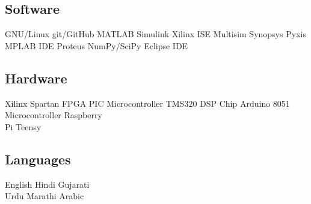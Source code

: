 \documentclass[]{deedy}
\begin{document}
\begin{minipage}[t]{0.27\textwidth}
\begin{flushleft}
\subsection{Software}
GNU/Linux \textbullet{} git/GitHub \textbullet{} MATLAB \textbullet{} Simulink \textbullet{} Xilinx ISE \textbullet{} Multisim \textbullet{} Synopsys \textbullet{} Pyxis \textbullet{} MPLAB IDE \textbullet{} Proteus \textbullet{} NumPy/SciPy \textbullet{} Eclipse IDE
%
\subsection{Hardware}
Xilinx Spartan FPGA \textbullet{} PIC Microcontroller \textbullet{} TMS320 DSP Chip \textbullet{} Arduino \textbullet{} 8051 Microcontroller \textbullet{} Raspberry \\
Pi \textbullet{} Teensy
%
\subsection{Languages}
English \textbullet{} Hindi \textbullet{} Gujarati \textbullet{} \\
Urdu \textbullet{} Marathi \textbullet{} Arabic
\sectionsep
%
\end{flushleft}
\end{minipage}
\hfill
%
\end{document}

